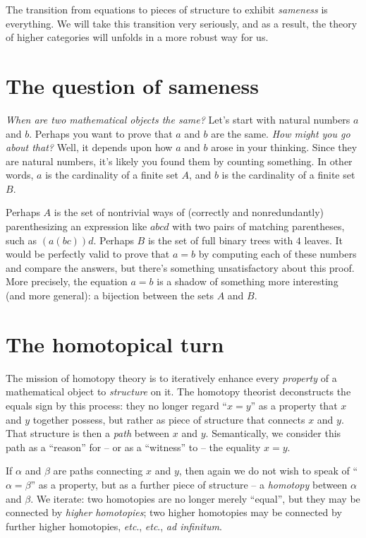 The transition from equations to pieces of structure to exhibit \emph{sameness} is everything.
We will take this transition very seriously, and
as a result, the theory of higher categories will unfolds in a more robust way for us.

\section*{The question of sameness \inc}%
\label{sec:sameness}%

\emph{When are two mathematical objects the same?}
Let's start with natural numbers $a$ and $b$.
Perhaps you want to prove that $a$ and $b$ are the same.
\emph{How might you go about that?}
Well, it depends upon how $a$ and $b$ arose in your thinking.
Since they are natural numbers, it's likely you found them by counting something.
In other words, $a$ is the cardinality of a finite set $A$, and
$b$ is the cardinality of a finite set $B$.

Perhaps $A$ is the set of nontrivial ways of (correctly and nonredundantly) parenthesizing an expression like $abcd$ with two pairs of matching parentheses,
such as $(a(bc))d$.
Perhaps $B$ is the set of full binary trees with $4$ leaves.
It would be perfectly valid to prove that $a=b$ by computing each of these numbers and compare the answers, but
there's something unsatisfactory about this proof.
More precisely, the equation $a=b$ is a shadow of something more interesting (and more general):
a bijection between the sets $A$ and $B$.

\section*{The homotopical turn}%
\label{sec:homotopical}

The mission of homotopy theory is to iteratively enhance every \emph{property} of a mathematical object to \emph{structure} on it.
The homotopy theorist deconstructs the equals sign by this process:
they no longer regard \enquote{$x = y$} as a property that $x$ and $y$ together possess,
but rather as piece of structure that connects $x$ and $y$.
That structure is then a \emph{path} between $x$ and $y$.
Semantically, we consider this path as a \enquote{reason} for -- or as a \enquote{witness} to -- the equality $x = y$.

If $\alpha$ and $\beta$ are paths connecting $x$ and $y$,
then again we do not wish to speak of \enquote{$\alpha = \beta$} as a property,
but as a further piece of structure -- a \emph{homotopy} between $\alpha$ and $\beta$.
We iterate: two homotopies are no longer merely \enquote{equal}, but they may be connected by \emph{higher homotopies};
two higher homotopies may be connected by further higher homotopies, \emph{etc}., \emph{etc}., \emph{ad infinitum}.

